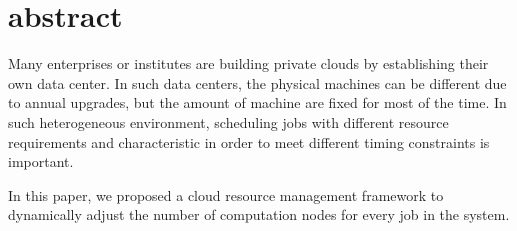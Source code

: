 \chapter{abstract}
Many enterprises or institutes are building private clouds by
establishing their own data center.
In such data centers, the physical machines can be different due to
annual upgrades,  but the amount of machine are fixed for most of the
time.
In such heterogeneous environment, scheduling jobs with different
resource requirements and characteristic in order to meet different
timing constraints is important.

In this paper, we proposed a cloud resource management framework to
dynamically adjust the number of computation nodes for every job in the
system.

